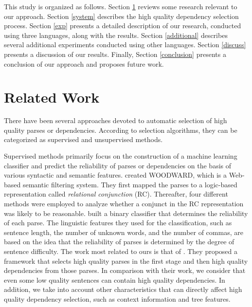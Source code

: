 \documentclass[english]{jnlp_1.4}
\begin{document}
This study is organized as follows. Section \ref{related} reviews some
research relevant to our approach.
Section \ref{system} describes the high quality dependency selection process.
Section \ref{exp} presents a detailed description of our research, conducted using three languages, along with the results.
Section \ref{additional} describes several additional experiments conducted using other languages.
Section \ref{discuss} presents a discussion of our results. 
Finally, Section \ref{conclusion} presents a conclusion of our approach and proposes future
work.


\section{Related Work}\label{related}

There have been several approaches devoted to automatic selection of
high quality parses or dependencies. According to selection
algorithms, they can be categorized as 
supervised and unsupervised methods.

Supervised methods primarily focus on the construction of a machine
learning classifier and predict the reliability of parses or dependencies
on the basis of various syntactic and semantic features. 
 created WOODWARD, which is a
Web-based semantic filtering system. They first mapped the parses to a logic-based representation called {\it relational conjunction} (RC).
Thereafter, four different methods were employed to analyze whether a conjunct in the RC representation was likely to be reasonable.
 built a binary classifier that determines the reliability of each parse. The linguistic
features they used for the classification, such as sentence length, the number of
unknown words, and the number of commas, are based on the idea that
the reliability of parses is determined by the degree of sentence difficulty.
The work most related to ours is that of .
They proposed a framework that selects high quality parses in the first
stage and then high quality dependencies from those parses. In comparison with their work, we consider that even some low
quality sentences can contain high quality dependencies. In addition, we take into
account other characteristics that can directly affect high quality dependency
selection, such as context information and tree features.
\end{document}
